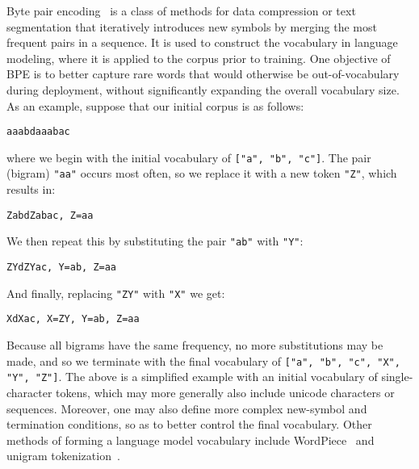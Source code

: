 Byte pair encoding~\citep{gage1994new,sennrich2015neural} is a class of methods for data compression or text segmentation that iteratively introduces new symbols by merging the most frequent pairs in a sequence.
It is used to construct the vocabulary in language modeling, where it is applied to the corpus prior to training.
One objective of BPE is to better capture rare words that would otherwise be out-of-vocabulary during deployment, without significantly expanding the overall vocabulary size.
As an example, suppose that our initial corpus is as follows:
\begin{center}
\begin{minipage}{0.5\linewidth}
\begin{verbatim}
aaabdaaabac
\end{verbatim}
\end{minipage}
\end{center}
where we begin with the initial vocabulary of \texttt{["a", "b", "c"]}.
The pair (bigram) \texttt{"aa"} occurs most often, so we replace it with a new token \texttt{"Z"}, which results in:
\begin{center}
\begin{minipage}{0.5\linewidth}
\begin{verbatim}
ZabdZabac, Z=aa
\end{verbatim}
\end{minipage}
\end{center}
We then repeat this by substituting the pair \texttt{"ab"} with \texttt{"Y"}:
\begin{center}
\begin{minipage}{0.5\linewidth}
\begin{verbatim}
ZYdZYac, Y=ab, Z=aa
\end{verbatim}
\end{minipage}
\end{center}
And finally, replacing \texttt{"ZY"} with \texttt{"X"} we get:
\begin{center}
\begin{minipage}{0.5\linewidth}
\begin{verbatim}
XdXac, X=ZY, Y=ab, Z=aa
\end{verbatim}
\end{minipage}
\end{center}
Because all bigrams have the same frequency, no more substitutions may be made, and so we terminate with the final vocabulary of \texttt{["a", "b", "c", "X", "Y", "Z"]}.
The above is a simplified example with an initial vocabulary of single-character tokens, which may more generally also include unicode characters or sequences.
Moreover, one may also define more complex new-symbol and termination conditions, so as to better control the final vocabulary.
Other methods of forming a language model vocabulary include WordPiece~\citep{schuster2012japanese} and unigram tokenization~\citep{kudo2018subword}.




